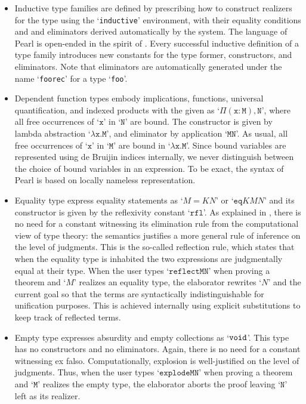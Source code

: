 \documentclass[a4paper]{article}
\begin{document}
\begin{itemize}
	\item Inductive type families are defined by prescribing how to construct realizers for the type using the `\texttt{inductive}' environment, with their equality conditions and and eliminators derived automatically by the system. The language of Pearl is open-ended in the spirit of \cite[\S9]{bentzen2026book}. Every successful inductive definition of a type family introduces new constants for the type former, constructors, and eliminators. Note that eliminators are automatically generated under the name `\texttt{foorec}' for a type `\texttt{foo}'. 
	
	\item Dependent function types embody implications, functions, universal quantification, and indexed products with the given as `$\mathtt{\Pi(x : M), N}$',
	where all free occurrences of `$\mathtt{x}$' in `$\mathtt{N}$' are bound. The constructor is given by
	lambda abstraction `$\mathtt{λ x.M}$', and eliminator by application `$\mathtt{M N}$'.
	As usual, all free occurrences of `$\mathtt{x}$' in `$\mathtt{M}$' are bound in `$\mathtt{λ x.M}$'. Since bound variables are represented using de Bruijin indices internally, we never
	distinguish between the choice of bound variables in an expression. To be exact, the syntax of Pearl is based on locally nameless representation.
	
	\item Equality type express equality statements as `$M = K N$' or `$\mathtt{eq} K M N$' and its constructor is given by the reflexivity constant `$\mathtt{rfl}$'. As explained in \cite{sterling2015typetheory,bentzen2026book}, there is no need for a constant witnessing its elimination rule from the computational view of type theory: the semantics justifies a more general rule of inference on the level of judgments. This is the so-called reflection rule, which states that when the equality type is inhabited the two expressions are judgmentally equal at their type. When the user types `$\mathtt{reflect M N}$' when proving a theorem and `$M$' realizes an equality type, the elaborator rewrites `$N$' and the current goal so that the terms are syntactically indistinguishable for unification purposes. This is achieved internally using explicit substitutions to keep track of reflected terms.
	
	\item Empty type expresses absurdity and empty collections as `$\mathtt{void}$'. This type has no constructors and no eliminators. Again, there is no need for a constant witnessing ex falso. Computationally, explosion is well-justified on the level of judgments. Thus, when the user types `$\mathtt{explode M N}$'  when proving a theorem and `$\mathtt{M}$' realizes the empty type, the elaborator aborts the proof leaving `$\mathtt{N}$' left as its realizer.
	

\end{itemize}
\end{document}
